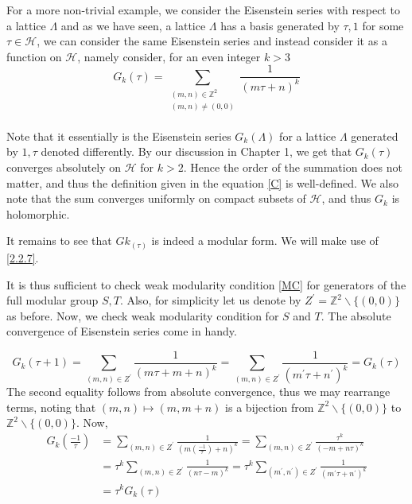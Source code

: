For a more non-trivial example, we consider the Eisenstein series with respect to a lattice $\Lambda$ and as we have seen, a lattice $\Lambda$ has a basis generated by $\tau,1$ for some $\tau \in \mathcal{H}$, we can consider the same Eisenstein series and instead consider it as a function on $\mathcal{H}$, namely consider, for an even integer $k>3$
\begin{equation}\label{C}
G_{k}(\tau)=\sum_{\substack{(m, n) \in \mathbb{Z}^{2} \\(m, n) \neq(0,0)}} \frac{1}{(m \tau+n)^{k}}    
\end{equation}
 \\
Note that it essentially is the Eisenstein series $G_k(\Lambda)$ for a lattice $\Lambda$ generated by $1,\tau$ denoted differently. By our discussion in Chapter 1, we get that $G_{k}(\tau)$ converges absolutely on $\mathcal{H}$ for $k>2$. Hence the order of the summation does not matter, and thus the definition given in the equation \ref{C} is well-defined. We also note that the sum converges uniformly on compact subsets of $\mathcal{H}$, and thus $G_{k}$ is holomorphic.

It remains to see that $Gk_(\tau)$ is indeed a modular form. We will make use of \ref{2.2.7}. 

It is thus sufficient to check weak modularity condition \ref{MC} for generators of the full modular group $S,T$. Also, for simplicity let us denote by $Z^{\prime}=\mathbb{Z}^{2} \backslash\{(0,0)\}$ as before.  
Now, we check weak modularity condition for $S$ and $T$.
The absolute convergence of Eisenstein series come in handy.

$$
G_{k}(\tau+1)=\sum_{(m, n) \in Z^{\prime}} \frac{1}{(m \tau+m+n)^{k}}=\sum_{(m, n) \in Z^{\prime}} \frac{1}{\left(m^{\prime} \tau+n^{\prime}\right)^{k}}=G_{k}(\tau)
$$
The second equality follows from absolute convergence, thus we may rearrange terms, noting that $(m, n) \mapsto(m, m+n)$ is a bijection from $\mathbb{Z}^{2} \backslash\{(0,0)\}$ to $\mathbb{Z}^{2} \backslash\{(0,0)\}$.
Now,
$$
\begin{aligned}
G_{k}\left(\frac{-1}{\tau}\right) & =\sum_{(m, n) \in Z^{\prime}} \frac{1}{\left(m\left(\frac{-1}{\tau}\right)+n\right)^{k}}=\sum_{(m, n) \in Z^{\prime}} \frac{\tau^{k}}{(-m+n \tau)^{k}} \\
& =\tau^{k} \sum_{(m, n) \in Z^{\prime}} \frac{1}{(n \tau-m)^{k}}=\tau^{k} \sum_{\left(m^{\prime}, n^{\prime}\right) \in Z^{\prime}} \frac{1}{\left(m^{\prime} \tau+n^{\prime}\right)^{k}} \\
& =\tau^{k} G_{k}(\tau)
\end{aligned}
$$

